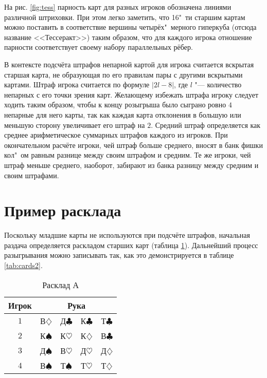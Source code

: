 На рис. \ref{fig:tess} парность карт для разных игроков обозначена линиями различной штриховки. При этом легко заметить, что 16"~ти старшим картам можно поставить в соответствие вершины четырёх"~мерного гиперкуба (отсюда название <<Тессеракт>>) таким образом, что для каждого игрока отношение парности соответствует своему набору параллельных рёбер.

В контексте подсчёта штрафов непарной картой для игрока считается вскрытая старшая карта, не образующая по его правилам пары с другими вскрытыми картами. Штраф игрока считается по формуле $\left|2l-8\right|$, где $l$ "--- количество непарных с его точки зрения карт. Желающему избежать штрафа игроку следует ходить таким образом, чтобы к концу розыгрыша было сыграно ровно $4$ непарные для него карты, так как каждая карта отклонения в большую или меньшую сторону увеличивает его штраф на $2$. Средний штраф определяется как среднее арифметическое суммарных штрафов каждого из игроков. При окончательном расчёте игроки, чей штраф больше среднего, вносят в банк фишки кол"~ом равным разнице между своим штрафом и средним. Те же игроки, чей штраф меньше среднего, наоборот, забирают из банка разницу между средним и своим штрафами.

\section{Пример расклада}\label{app:D2}

Поскольку младшие карты не используются при подсчёте штрафов, начальная раздача определяется раскладом старших карт (таблица \ref{tab:cards1}). Дальнейший процесс разыгрывания можно записывать так, как это демонстрируется в таблице \ref{tab:cards2}.

\begin{table}[htbp]
	\centering
	\caption{Расклад А}
	\label{tab:cards1}
	\begin{SingleSpace}
		\begin{tabular}{|c|cccc|}
			\hline
			Игрок & \multicolumn{4}{c|}{Рука} \\
			\hline
			$1$ & В$\diamondsuit$ & Д$\clubsuit$ & К$\clubsuit$ & Т$\clubsuit$ \\
			$2$ & К$\spadesuit$ & К$\heartsuit$ & К$\diamondsuit$ & В$\clubsuit$ \\
			$3$ & Д$\spadesuit$ & В$\heartsuit$ & Д$\heartsuit$ & Д$\diamondsuit$ \\
			$4$ & В$\spadesuit$ & Т$\spadesuit$ & Т$\heartsuit$ & Т$\diamondsuit$ \\
			\hline
		\end{tabular}
	\end{SingleSpace}
\end{table}

